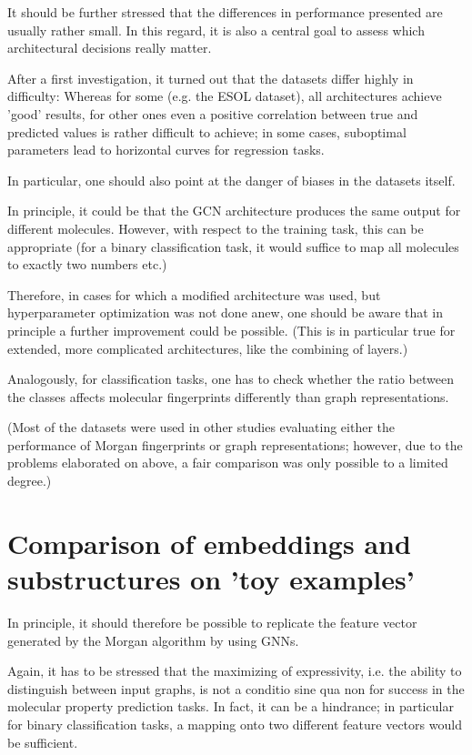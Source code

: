 It should be further stressed that the differences in performance presented are usually rather small.
In this regard, it is also a central goal to assess which architectural decisions really matter.

After a first investigation, it turned out that the datasets differ highly in difficulty: Whereas for some (e.g. the ESOL dataset), all architectures achieve 'good' results, for other ones even a positive correlation between true and predicted values is rather difficult to achieve; in some cases, suboptimal parameters lead to horizontal curves for regression tasks.


In particular, one should also point at the danger of biases in the datasets itself.

In principle, it could be that the GCN architecture produces the same output for different molecules. However, with respect to the training task, this can be appropriate (for a binary classification task, it would suffice to map all molecules to exactly two numbers etc.)


Therefore, in cases for which a modified architecture was used, but hyperparameter optimization was not done anew, one should be aware that in principle a further improvement could be possible. (This is in particular true for extended, more complicated architectures, like the combining of layers.)


Analogously, for classification tasks, one has to check whether the ratio between the classes affects molecular fingerprints differently than graph representations.


(Most of the datasets were used in other studies evaluating either the performance of Morgan fingerprints or graph representations; however, due to the problems elaborated on above, a fair comparison was only possible to a limited degree.)



\section{Comparison of embeddings and substructures on 'toy examples'}

In principle, it should therefore be possible to replicate the feature vector generated by the Morgan algorithm by using GNNs. 

Again, it has to be stressed that the maximizing of expressivity, i.e. the ability to distinguish between input graphs, is not a conditio sine qua non for success in the molecular property prediction tasks. In fact, it can be a hindrance; in particular for binary classification tasks, a mapping onto two different feature vectors would be sufficient.

